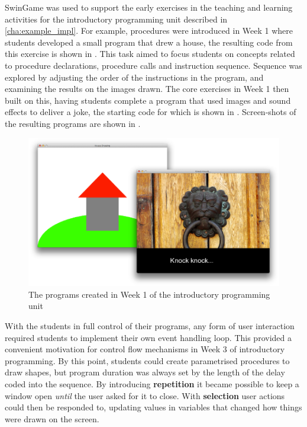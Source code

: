 SwinGame was used to support the early exercises in the teaching and learning activities for the introductory programming unit described in \cref{cha:example_impl}. For example, procedures were introduced in Week 1 where students developed a small program that drew a house, the resulting code from this exercise is shown in . This task aimed to focus students on concepts related to procedure declarations, procedure calls and instruction sequence. Sequence was explored by adjusting the order of the instructions in the program, and examining the results on the images drawn. The core exercises in Week 1 then built on this, having students complete a program that used images and sound effects to deliver a joke, the starting code for which is shown in . Screen-shots of the resulting programs are shown in .



\begin{figure}[thb]
  \centering
  \includegraphics[width=\textwidth]{Week1Progs}
  \caption{The programs created in Week 1 of the introductory programming unit}
  \label{fig:week1_progs}
\end{figure}

With the students in full control of their programs, any form of user interaction required students to implement their own event handling loop. This provided a convenient motivation for control flow mechanisms in Week 3 of introductory programming. By this point, students could create parametrised procedures to draw shapes, but program duration was always set by the length of the delay coded into the sequence. By introducing \textbf{repetition} it became possible to keep a window open \emph{until} the user asked for it to close. With \textbf{selection} user actions could then be responded to, updating values in variables that changed how things were drawn on the screen.

